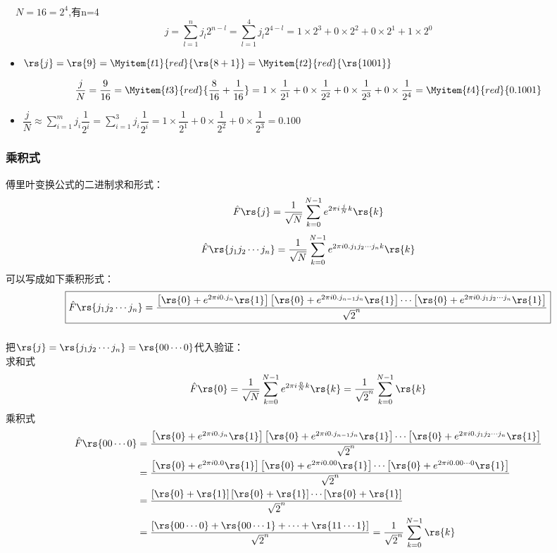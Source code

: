 \begin{frame}
    \frametitle{}
    \例[~令 j=9,N=16,m=3 (精度为小数点后三位),写出$\rs{j}$和$\dfrac{j}{N}$的二进制形式] {}
    \解~ $N=16=2^4$,有n=4
    \[j=\sum\limits_{l=1} ^n j_l 2^{n-l} = \sum\limits_{l=1} ^4 j_l 2^{4-l} = 1\times 2^3 + 0\times 2^2 + 0\times 2^1 + 1\times 2^0 \qquad \] 
    \begin{itemize}
        \item $\rs{j}= \rs{9}=\Myitem{t1}{red}{\rs{8+1}}=\Myitem{t2}{red}{\rs{1001}}$ 
    \end{itemize}
    \[\frac{j}{N} = \frac{9}{16} = \Myitem{t3}{red}{\frac{8}{16}+ \frac{1}{16}} = 1\times\frac{1}{2^1} + 0\times\frac{1}{2^2}+ 0\times\frac{1}{2^3} + 0\times\frac{1}{2^4} =\Myitem{t4}{red}{0.1001}\]
    \begin{itemize}
        \item $\dfrac{j}{N} \approx \sum\limits_{i=1} ^m j_i \dfrac{1}{2^{i}} = \sum\limits_{i=1} ^3 j_i \dfrac{1}{2^{i}} = 1\times\dfrac{1}{2^1} + 0\times\dfrac{1}{2^2}+ 0\times\dfrac{1}{2^3} =0.100$
    \end{itemize}
\end{frame}

\begin{frame}
    \frametitle{乘积式}
    傅里叶变换公式的二进制求和形式：
    \[ \hat{F} \rs{j} = \frac{1}{\sqrt{N}} \sum_{k=0} ^{N-1} e^{2\pi i  \frac{j}{N} k} \rs{k}\]
    \[ \hat{F} \rs{j_1j_2\cdots j_n} = \frac{1}{\sqrt{N}} \sum_{k=0} ^{N-1} e^{2\pi i  0.j_1j_2\cdots j_n k} \rs{k}\]
    可以写成如下乘积形式：
    \[\boxed{\hat{F} \rs{j_1j_2\cdots j_n}=\frac{\left[ \rs{0}+ e^{2\pi i 0.j_n} \rs{1} \right]\left[ \rs{0}+ e^{2\pi i 0. j_{n-1}j_n} \rs{1} \right]\cdots \left[ \rs{0}+ e^{2\pi i 0. j_1 j_2 \cdots j_n} \rs{1} \right] }{\sqrt{2}^n }
    }\]
\end{frame}

\begin{frame}
    \frametitle{}
    把$\rs{j}=\rs{j_1 j_2 \cdots j_n} =\rs{00\cdots0}$代入验证：\\
    求和式
    \[ \hat{F} \rs{0} = \frac{1}{\sqrt{N}} \sum_{k=0} ^{N-1} e^{2\pi i \frac{0}{N} k} \rs{k} = \frac{1}{\sqrt{2}^n} \sum_{k=0} ^{N-1} \rs{k}
    \] 
    乘积式
    \[\begin{aligned} 
    \hat{F} \rs{00\cdots 0}
    &=\frac{\left[ \rs{0}+ e^{2\pi i 0.j_n} \rs{1} \right]\left[ \rs{0}+ e^{2\pi i 0. j_{n-1}j_n} \rs{1} \right]\cdots \left[ \rs{0}+ e^{2\pi i 0. j_1 j_2 \cdots j_n} \rs{1} \right] }{\sqrt{2}^n }\\
    &=\frac{\left[ \rs{0}+ e^{2\pi i 0.0} \rs{1} \right]\left[ \rs{0}+ e^{2\pi i 0.00} \rs{1} \right]\cdots \left[ \rs{0}+ e^{2\pi i 0.00 \cdots 0} \rs{1} \right] }{\sqrt{2}^n }\\
    &=\frac{\left[ \rs{0}+  \rs{1} \right]\left[ \rs{0}+  \rs{1} \right]\cdots \left[ \rs{0}+ \rs{1} \right] }{\sqrt{2}^n } \\
    &=\frac{\left[ \rs{00\cdots 0 }+ \rs{00\cdots 1 } +\cdots + \rs{11\cdots 1 } \right] }{\sqrt{2}^n } =\frac{1}{\sqrt{2}^n} \sum_{k=0} ^{N-1} \rs{k} 
    \end{aligned}\]
\end{frame}


